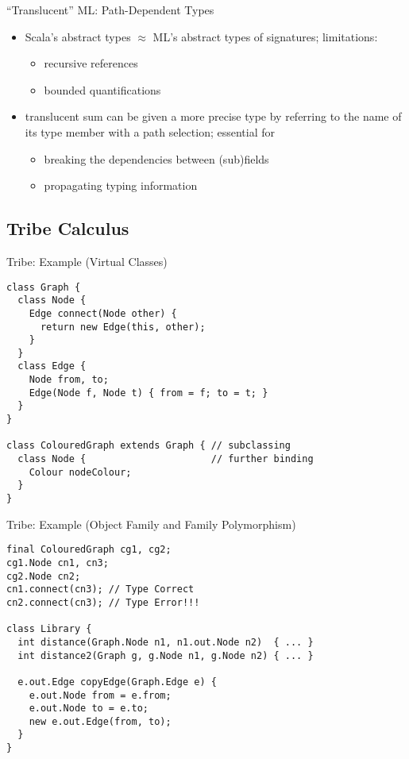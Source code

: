 \documentclass{beamer}
\begin{document}
\begin{frame}{``Translucent'' ML: Path-Dependent Types}
\begin{itemize}
\item Scala's abstract types  $\approx$ ML's abstract types of signatures; limitations:
\begin{itemize}
\item recursive references
\item bounded quantifications
\end{itemize}
\item translucent sum can be given a more precise type by referring to the name of its type member with a path selection; essential for %
\begin{itemize}
\item breaking the dependencies between (sub)fields
\item propagating typing information
\end{itemize}
\end{itemize}
\end{frame}

\subsection{Tribe Calculus}

\begin{frame}[fragile]{Tribe: Example (Virtual Classes)}
\begin{verbatim}
class Graph {
  class Node {
    Edge connect(Node other) {
      return new Edge(this, other);
    }
  }
  class Edge {
    Node from, to;
    Edge(Node f, Node t) { from = f; to = t; }
  }
}

class ColouredGraph extends Graph { // subclassing
  class Node {                      // further binding
    Colour nodeColour;
  }
}
\end{verbatim}
\end{frame}

\begin{frame}[fragile]{Tribe: Example (Object Family and Family Polymorphism)}
\begin{verbatim}
final ColouredGraph cg1, cg2;
cg1.Node cn1, cn3;
cg2.Node cn2;
cn1.connect(cn3); // Type Correct
cn2.connect(cn3); // Type Error!!!

class Library {
  int distance(Graph.Node n1, n1.out.Node n2)  { ... }
  int distance2(Graph g, g.Node n1, g.Node n2) { ... }

  e.out.Edge copyEdge(Graph.Edge e) {
    e.out.Node from = e.from;
    e.out.Node to = e.to;
    new e.out.Edge(from, to);
  }
}
\end{verbatim}
\end{frame}
\end{document}

